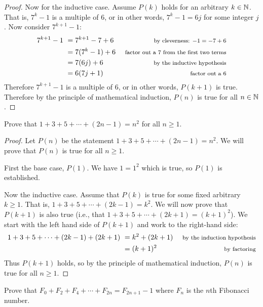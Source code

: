\begin{questions}
\begin{answer}
\begin{proof}
		 Now for the inductive case.  Assume $P(k)$ holds for an arbitrary $k \in \mathbb N$.  That is, $7^k - 1$ is a multiple of 6, or in other words, $7^k - 1 = 6j$ for some integer $j$.  Now consider $7^{k+1} - 1$:
		 \begin{align*}
		  7^{k+1} - 1 ~ & = 7^{k+1} - 7 + 6 & \mbox{ \footnotesize by cleverness: $-1 = -7 + 6$}\\
		  & = 7(7^k - 1) + 6 & \mbox{ \footnotesize factor out a 7 from the first two terms}\\
		  & = 7(6j) + 6 & \mbox{ \footnotesize by the inductive hypothesis}\\
		  & = 6(7j + 1) & \mbox{ \footnotesize factor out a 6}
		 \end{align*}
		Therefore $7^{k+1} - 1$ is a multiple of 6, or in other words, $P(k+1)$ is true.  Therefore by the principle of mathematical induction, $P(n)$ is true for all $n \in \mathbb N$.
		\end{proof}
	\end{answer}
	
	
	

\question Prove that $1 + 3 + 5 + \cdots + (2n-1) = n^2$ for all $n \ge 1$.

	\begin{answer}
		\begin{proof}
		 Let $P(n)$ be the statement $1+3 +5 + \cdots + (2n-1) = n^2$.  We will prove that $P(n)$ is true for all $n \ge 1$.  
		 
		 First the base case, $P(1)$.  We have $ 1 = 1^2$ which is true, so $P(1)$ is established.
		 
		 Now the inductive case.  Assume that $P(k)$ is true for some fixed arbitrary $k \ge 1$.  That is, $1 + 3 + 5 + \cdots + (2k-1) = k^2$.  We will now prove that $P(k+1)$ is also true (i.e., that $1 + 3 + 5 + \cdots + (2k+1) = (k+1)^2$).  We start with the left hand side of $P(k+1)$ and work to the right-hand side:
		 \begin{align*}
		  1 + 3 + 5 + \cdots + (2k-1) + (2k+1) ~ & = k^2 + (2k+1) & \mbox{ \footnotesize by the induction hypothesis}\\
		  & = (k+1)^2 & \mbox{ \footnotesize by factoring}
		 \end{align*}
		Thus $P(k+1)$ holds, so by the principle of mathematical induction, $P(n)$ is true for all $n \ge 1$.
		\end{proof}
	\end{answer}
	
	
	

\question Prove that $F_0 + F_2 + F_4 + \cdots + F_{2n} = F_{2n+1} - 1$ where $F_n$ is the $n$th Fibonacci number.


\end{questions}
